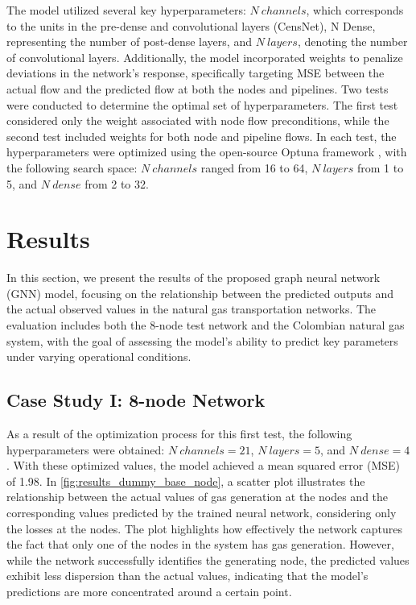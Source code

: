 The model utilized several key hyperparameters: $N \ channels$, which corresponds to the units in the pre-dense and convolutional layers (CensNet), N Dense, representing the number of post-dense layers, and $N \ layers$, denoting the number of convolutional layers. Additionally, the model incorporated weights to penalize deviations in the network's response, specifically targeting MSE between the actual flow and the predicted flow at both the nodes and pipelines. Two tests were conducted to determine the optimal set of hyperparameters. The first test considered only the weight associated with node flow preconditions, while the second test included weights for both node and pipeline flows. In each test, the hyperparameters were optimized using the open-source Optuna framework \cite{optuna_2019}, with the following search space: $N \ channels$ ranged from 16 to 64, $N \ layers$ from 1 to 5, and $N \ dense$ from 2 to 32.




\section{Results}

In this section, we present the results of the proposed graph neural network (GNN) model, focusing on the relationship between the predicted outputs and the actual observed values in the natural gas transportation networks. The evaluation includes both the 8-node test network and the Colombian natural gas system, with the goal of assessing the model's ability to predict key parameters under varying operational conditions. 


%
%     
%

\subsection{Case Study I: 8-node Network}


As a result of the optimization process for this first test, the following hyperparameters were obtained: $N \ channels=21$, $N \ layers=5$, and $N \ dense=4$. With these optimized values, the model achieved a mean squared error (MSE) of 1.98. In \cref{fig:results_dummy_base_node}, a scatter plot illustrates the relationship between the actual values of gas generation at the nodes and the corresponding values predicted by the trained neural network, considering only the losses at the nodes. The plot highlights how effectively the network captures the fact that only one of the nodes in the system has gas generation. However, while the network successfully identifies the generating node, the predicted values exhibit less dispersion than the actual values, indicating that the model's predictions are more concentrated around a certain point.

